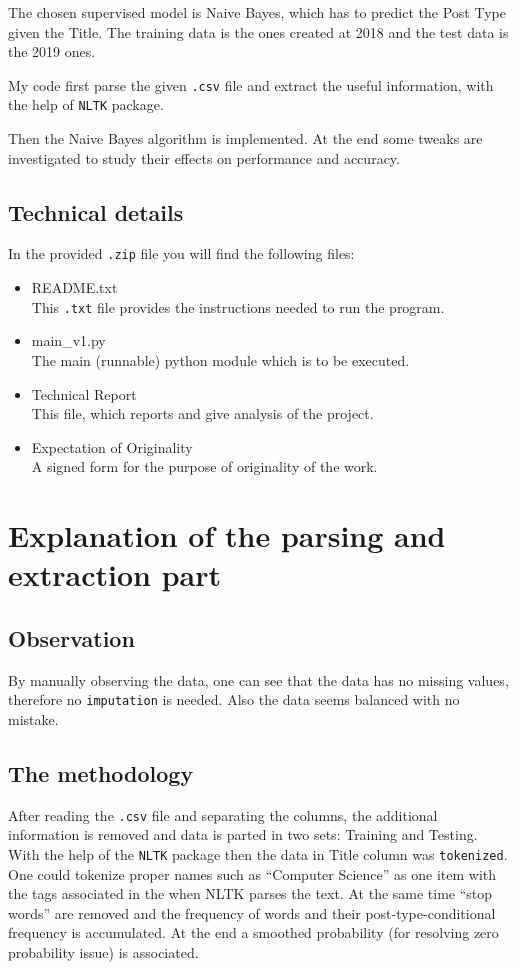 \documentclass[11pt]{article}
\begin{document}
			The chosen supervised model is Naive Bayes, which has to predict the Post Type given the Title. The training data is the ones created at 2018 and the test data is the 2019 ones.
			
			My code first parse the given \texttt{.csv} file and extract the useful information, with the help of \texttt{NLTK} package.
			
			Then the Naive Bayes algorithm is implemented. At the end some tweaks are investigated to study their effects on performance and accuracy.
			
		\subsection{Technical details}
			In the provided \texttt{.zip} file you will find the following files:
			\begin{itemize}
				\item {\ttfamily README.txt}\\
					This \texttt{.txt} file provides the instructions needed to run the program.
				\item {\ttfamily main\_v1.py}\\
					The main (runnable) python module which is to be executed.
				\item {\ttfamily Technical Report}\\
					This file, which reports and give analysis of the project.
				\item {\ttfamily Expectation of Originality}\\
					A signed form for the purpose of originality of the work.
			\end{itemize}
	\section{Explanation of the parsing and extraction part}
		\subsection{Observation}
			By manually observing the data, one can see that the data has no missing values, therefore no \texttt{imputation} is needed.
			Also the data seems balanced with no mistake.
		
		\subsection{The methodology}
		After reading the \texttt{.csv} file and separating the columns, the additional information is removed and data is parted in two sets: Training and Testing.
		With the help of the \texttt{NLTK} package then the data in Title column was \texttt{tokenized}. One could tokenize proper names such as ``Computer Science''
		as one item with the tags associated in the when NLTK parses the text. At the same time ``stop words'' are removed and the frequency of words and their post-type-conditional
		frequency is accumulated. At the end a smoothed probability (for resolving zero probability issue) is associated. 
		
\end{document}
